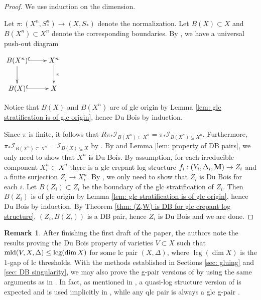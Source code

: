 \documentclass[11pt]{amsart}
\numberwithin{equation}{section}
\newcommand{\Mm}{{\bf{M}}}
\newcommand{\lcg}{\operatorname{lcg}}
\newcommand{\mld}{{\rm{mld}}}
\theoremstyle{definition}
\theoremstyle{definition}
\newtheorem{rem}[thm]{Remark}
\theoremstyle{definition}
\begin{document}
\begin{proof}
  We use induction on the dimension.

  Let $\pi: (X^n,S^n_*)\to (X,S_*)$ denote the normalization. Let
  $B(X)\subset X$ and
  $B(X^n)\subset X^n$ denote the corresponding boundaries. By
  \cite[9.15.1]{Kol13}, we have a universal push-out diagram
  \begin{center}
    $\xymatrix{
      B(X^n)\ar@{^(->}[r]\ar@{->}[d] & X^n\ar@{->}[d]^{\pi}\\
        B(X)\ar@{^(->}[r]& X\\
        }$
      \end{center}
      Notice that $B(X)$ and $B(X^n)$ are of glc origin by Lemma
      \ref{lem: glc stratification is of glc origin}, hence Du Bois
      by induction.

      Since $\pi$ is finite, it follows that
      $R\pi_*\mathcal{I}_{B(X^n)\subset
      X^n}=\pi_*\mathcal{I}_{B(X^n)\subseteq X^n}$. Furthermore,
      $\pi_*\mathcal{I}_{B(X^n)\subseteq
      X^n}=\mathcal{I}_{B(X)\subseteq X}$ by \cite[Theorem
      9.30]{Kol13}. By \cite[Theorem 3.3]{Kov12} and Lemma \ref{lem:
      property of DB pairs}, we only need to show that $X^n$ is Du
      Bois. By assumption, for each irreducible component
      $X_i^n\subset X^n$ there is a glc crepant log structure
      $f_i:(Y_i,\Delta_i,\Mm)\to Z_i$ and a finite surjection $Z_i\to
      X_i^n$. By \cite[Corollary 2.5]{Kov99}, we only need to show
      that $Z_i$ is Du Bois for each $i$. Let $B(Z_i)\subset Z_i$ be
      the boundary of the glc stratification of $Z_i$. Then  $B(Z_i)$
      is of glc origin by Lemma \ref{lem: glc stratification is of
      glc origin}, hence Du Bois by induction. By Theorem \ref{thm:
      (Z,W) is DB for glc crepant log structure}, $(Z_i,B(Z_i))$ is a
      DB pair, hence $Z_i$ is Du Bois and we are done.
    \end{proof}

    \begin{rem}
      After finishing the first draft of the paper, the authors note
      the results \cite[Theorems 1,12]{KK22} proving the Du Bois
      property of varieties $V\subset X$ such that
      $\mld(V,X,\Delta)\leq\lcg(\dim X)$ for some lc pair
      $(X,\Delta)$, where $\lcg(\dim X)$ is the $1$-gap of lc
      thresholds. With the methods established in Sections \ref{sec:
      gluing} and \ref{sec: DB singularity}, we may also prove the
      g-pair versions of \cite[Theorems 1,12]{KK22} by using the same
      arguments as in \cite{KK22}. In fact, as mentioned in
      \cite[Proof of Theorems 1 and 12]{KK22}, a quasi-log structure
      \cite{Fuj17} version of \cite[Theorems 1,12]{KK22} is expected
      and is used implicitly in \cite[Proof of Proposition 16]{KK22},
      while any qlc pair is always a glc g-pair \cite[Remark 1.9]{Fuj22}.
    \end{rem}
\end{document}
